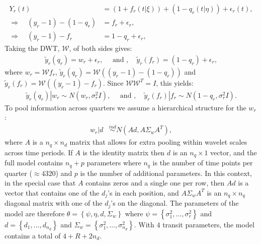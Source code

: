 \documentclass[a4paper,11pt]{article}
\newcommand{\simind}{\stackrel{ind}{\sim}}
\begin{document}
\begin{align}
 Y_{r}(t) &= (1+f_{r}(t|\xi)) + (1-q_{r}(t|\eta)) + \epsilon_{r}(t) , \\
 \nonumber
 \Rightarrow \quad (y_{r}-1) - (1-q_{r}) &= f_{r}  + \epsilon_{r} ,\\
 \Rightarrow \quad (y_{r}-1) - f_{r} &= 1-q_{r}  + \epsilon_{r} ,
\end{align}
Taking the DWT, $\mathcal{W}$, of both sides gives:
\begin{align}
 \tilde{y}_{r}(q_{r}) = w_{r}  + \epsilon_{r} , \quad \textrm{ and } , \quad
 \tilde{y}_{r}(f_{r}) = (1-q_{r})  + \epsilon_{r} ,
\end{align}
where $w_{r}=\mathcal{W}f_{r}$, $\tilde{y}_{r}(q_{r})=\mathcal{W}((y_{r}-1)-(1-q_{r}))$ and $\tilde{y}_{r}(f_{r})=\mathcal{W}((y_{r}-1)-f_{r})$. Since $\mathcal{W}\mathcal{W}^{T}=I$, this yields:
\begin{align}
\label{eq:tilde_y_model}
\tilde{y}_{r}(q_{r}) | w_{r} \sim N\left(w_{r},\sigma_{r}^{2}I\right) , \quad \textrm{ and } , \quad
\tilde{y}_{r}(f_{r}) | f_{r} \sim N\left(1-q_{r},\sigma_{r}^{2}I\right) . 
\end{align}
To pool information across quarters we assume a hierarchical structure for the $w_{r}$:
\begin{align}
\label{eq:w_model}
w_{r} | d &\simind N\left(Ad,A\Sigma_{w}A^{T}\right) ,
\end{align}
where $A$ is a $n_{q}\times{}n_{d}$ matrix that allows for extra pooling within wavelet scales across time periods. If $A$ is the identity matrix then $d$ is an $n_{q}\times{}1$ vector, and the full model contains $n_{q}+p$ parameters where $n_{q}$ is the number of time points per quarter ($\approx{}4320$) and $p$ is the number of additional parameters. In this context, in the special case that $A$ contains zeros and a single one per row, then $Ad$ is a vector that contains one of the $d_{j}$'s in each position, and $A\Sigma_{w}A^{T}$ is an $n_{q}\times{}n_{q}$ diagonal matrix with one of the $d_{j}$'s on the diagonal. The parameters of the model are therefore $\theta=\left\{\psi,\eta,d,\Sigma_{w}\right\}$ where $\psi=\left\{\sigma^{2}_{1},\ldots,\sigma^{2}_{r}\right\}$ and $d=\left\{d_{1},\ldots,d_{n_{d}}\right\}$ and $\Sigma_{w}=\left\{\sigma^{2}_{1},\ldots,\sigma^{2}_{n_{d}}\right\}$. With $4$ transit parameters, the model contains a total of $4+R+2n_{d}$. 
\end{document}
